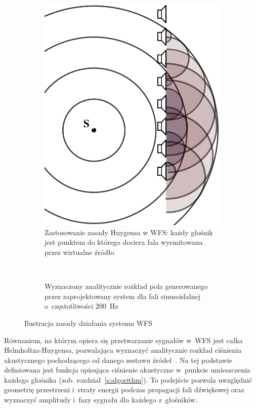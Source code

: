 \documentclass[10pt, a4paper]{article}
\begin{document}
\begin{figure}[!tbh]
  \centering
  \begin{subfigure}[b]{.49\textwidth}
    \centering
    \includegraphics[scale=.35]{vecgraphics/WFS_idea.pdf}
    \caption{Zastosowanie zasady Huygensa w WFS: każdy głośnik jest punktem do
    którego dociera fala wyemitowana przez wirtualne źródło}
    \label{r:Huygens}
  \end{subfigure}
  ~
  \begin{subfigure}[b]{.49\textwidth}
    \centering
    \caption{Wyznaczony analitycznie rozkład pola generowanego przez zaprojektowany system dla fali sinusoidalnej o~częstotliwości \SI{200}{\hertz}}
    \label{r:symulacja}
  \end{subfigure}
  \caption{Ilustracja zasady działania systemu WFS}
\end{figure}

Równaniem, na którym opiera się przetwarzanie sygnałów w~WFS jest całka
Helmholtza-Huygensa,
pozwalająca wyznaczyć analitycznie rozkład ciśnienia akustycznego pochodzącego od danego
zestawu źródeł~\cite{snakowska}. Na tej podstawie definiowana jest funkcja
opisująca ciśnienie akustyczne w~punkcie umieszczenia każdego głośnika (zob. rozdział~\ref{s:algorithm}). To
podejście pozwala uwzględnić geometrię przestrzeni i~straty energii podczas
propagacji fali dźwiękowej oraz wyznaczyć amplitudy i~fazy sygnału dla każdego
z~głośników.
\end{document}
